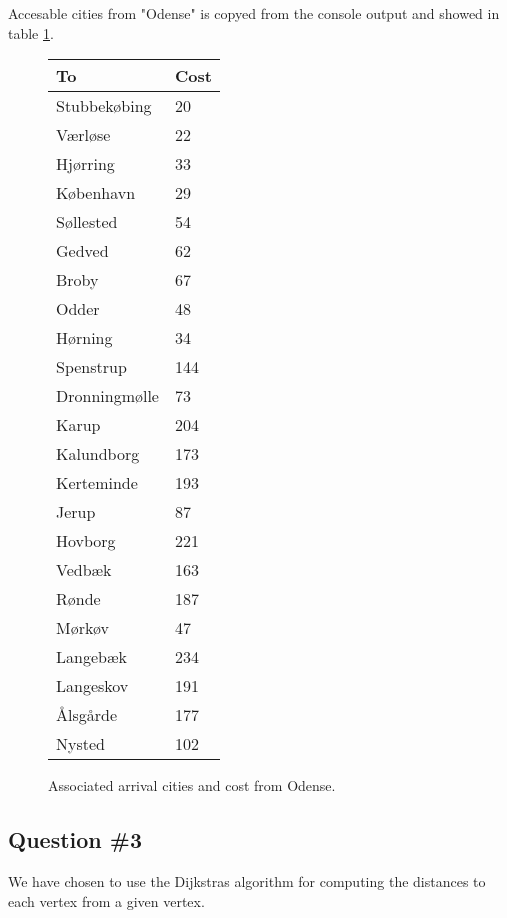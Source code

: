 Accesable cities from "Odense" is copyed from the console output and showed in table \ref{tb:fromodense}. 
\begin{figure}[th!]
\centering
\begin{tabular}{l|l}
To &Cost\\\hline
Stubbekøbing & 20\\
Værløse & 22\\
Hjørring & 33\\
København & 29\\
Søllested & 54\\
Gedved & 62\\
Broby & 67\\
Odder & 48\\
Hørning & 34\\
Spenstrup & 144\\
Dronningmølle & 73\\
Karup & 204\\
Kalundborg & 173\\
Kerteminde & 193\\
Jerup & 87\\
Hovborg & 221\\
Vedbæk & 163\\
Rønde & 187\\
Mørkøv & 47\\
Langebæk & 234\\
Langeskov & 191\\
Ålsgårde & 177\\
Nysted & 102\\
\end{tabular}
\captionsetup{type=table}
\caption[tekst i indholdsfortegnelsen]{Associated arrival cities and cost from Odense.}
\label{tb:fromodense}
\end{figure}

\subsection{Question \#3}
We have chosen to use the Dijkstras algorithm for computing the distances to each vertex from a given vertex. \\

